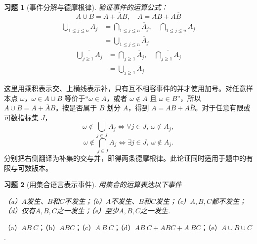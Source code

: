 \documentclass[12pt,fontset=fandol]{ctexart}
\newtheorem{exercise}{习题}[section]
\begin{document}
\begin{exercise}[事件分解与德摩根律]\label{q:Y1.1}
验证事件的运算公式：
\[
A\cup B=A+\overline{A}B,\quad A=AB+A\overline{B}
\]
\[\begin{aligned}\overline {\bigcup\limits_{1 \leqslant j \leqslant n} {{A_j}} }  &= \bigcap\limits_{1 \leqslant j \leqslant n} {{{\overline A }_j}},\quad  \overline {\bigcap\limits_{1 \leqslant j \leqslant n} {{A_j}} }  \\&= \bigcup\limits_{1 \leqslant j \leqslant n} {{{\overline A }_j}} \end{aligned}\]
\[\begin{aligned}\overline {\bigcup\limits_{j \geqslant 1} {{A_j}} }  &= \bigcap\limits_{j \geqslant 1} {{{\overline A }_j}},\quad  \overline {\bigcap\limits_{j \geqslant 1} {{A_j}} }  \\&= \bigcup\limits_{j \geqslant 1} {{{\overline A }_j}} \end{aligned}\]\par{}
\end{exercise}

\begin{solve}\label{a:Y1.1}这里用乘积表示交、上横线表示补，只有互不相容事件的并才使用加号。对任意样本点 $\omega$，$\omega\in A\cup B$ 等价于“$\omega\in A$，或者 $\omega\notin A$ 且 $\omega\in B$”，所以 $A\cup B=A+\overline AB$。按是否属于 $B$ 划分 $A$，得到 $A=AB+A\overline B$。对于任意有限或可数指标集 $J$，\[\omega\notin\bigcup_{j\in J}A_j\iff\forall j\in J,\ \omega\notin A_j,\]\[\omega\notin\bigcap_{j\in J}A_j\iff\exists j\in J,\ \omega\notin A_j.\]分别把右侧翻译为补集的交与并，即得两条德摩根律。此论证同时适用于题中的有限与可数版本。\end{solve}

\begin{exercise}[用集合语言表示事件]\label{q:Y1.2}
用集合的运算表达以下事件

（a）$A$发生、$B$和$C$不发生；（b）$A$不发生、$B$和$C$发生；（c）$A,B,C$都不发生；（d）仅有$A,B,C$之一发生；（e）至少$A,B,C$之一发生.\par{}
\end{exercise}

\begin{solve}\label{a:Y1.2}
（a）$A\overline{B}\:{\overline{C}}$；（b）$\overline{A}BC$；（c）$\overline{A}\:\overline{B}\:\overline{C}$；（d）$A\overline{B}\:\overline{C}+\overline{A}B\overline{C}+\overline{A}\:\overline{B}C$；（e）$A\cup B\cup C$.
\end{solve}
\end{document}
